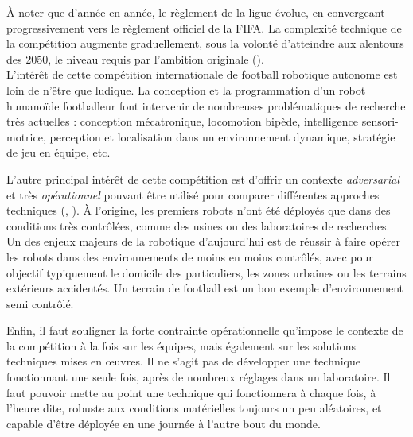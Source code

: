 À noter que d'année en année, le règlement de la ligue évolue,
en convergeant progressivement vers le règlement officiel de la FIFA.
La complexité technique de la compétition augmente graduellement, 
sous la volonté d'atteindre aux alentours des 2050, le niveau 
requis par l'ambition originale (\cite{baltes_robocup_2014}).\\

L'intérêt de cette compétition internationale de football 
robotique autonome est loin de n'être que ludique.
La conception et la programmation d'un robot humanoïde footballeur font
intervenir de nombreuses problématiques de recherche très actuelles :
conception mécatronique, locomotion bipède, 
intelligence sensori-motrice, perception et localisation 
dans un environnement dynamique, stratégie de jeu en équipe, etc.

L'autre principal intérêt de cette compétition est 
d'offrir un contexte \og \textit{adversarial} \fg et très \textit{opérationnel}
pouvant être utilisé pour comparer différentes 
approches techniques (\cite{behnke_robot_2006}, \cite{anderson_robotics_2011}).
À l'origine, les premiers robots n'ont été déployés que dans des conditions
très contrôlées, comme des usines ou des laboratoires de recherches.
Un des enjeux majeurs de la robotique d'aujourd'hui est de réussir à 
faire opérer les robots dans des environnements de moins en moins contrôlés, 
avec pour objectif typiquement le domicile des particuliers, 
les zones urbaines ou les terrains extérieurs accidentés.
Un terrain de football est un bon exemple d'environnement 
semi contrôlé.

Enfin, il faut souligner la forte contrainte opérationnelle qu'impose le contexte
de la compétition à la fois sur les équipes, mais également sur les solutions
techniques mises en œuvres.
Il ne s'agit pas de développer une technique fonctionnant une seule fois, 
après de nombreux réglages dans un laboratoire.
Il faut pouvoir mette au point une technique qui fonctionnera à chaque fois, 
à l'heure dite, robuste aux conditions matérielles toujours un peu aléatoires, 
et capable d'être déployée en une journée à l'autre bout du monde.\\

